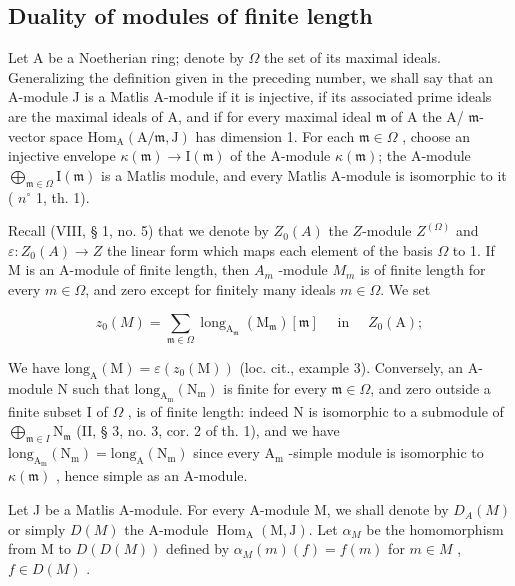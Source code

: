 \subsection{Duality of modules of finite length}

Let A be a Noetherian ring; denote by \(\Omega\) the set of its maximal ideals. Generalizing the definition given in the preceding number, we shall say that an A-module J is a Matlis A-module if it is injective, if its associated prime ideals are the maximal ideals of A, and if for every maximal ideal \(\mathfrak{m}\) of A the A/ \(\mathfrak{m}\)-vector space \(\mathrm{Hom}_{\mathrm{A}}(\mathrm{A}/\mathfrak{m},\mathrm{J})\) has dimension 1. For each \(\mathfrak{m} \in \Omega\) , choose an injective envelope \(\kappa(\mathfrak{m}) \to \mathrm{I}(\mathfrak{m})\) of the A-module \(\kappa(\mathfrak{m})\); the A-module \(\bigoplus_{\mathfrak{m} \in \Omega} \mathrm{I}(\mathfrak{m})\) is a Matlis module, and every Matlis A-module is isomorphic to it ( \(n^{\circ}\) 1, th. 1).

Recall (VIII, § 1, no. 5) that we denote by \(Z_0(A)\) the \(Z\)-module \(Z^{(\Omega)}\) and \(\varepsilon : Z_0(A) \to Z\) the linear form which maps each element of the basis \(\Omega\) to 1. If M is an A-module of finite length, then \(A_m\) -module \(M_m\) is of finite length for every \(m \in \Omega\), and zero except for finitely many ideals \(m \in \Omega\). We set

\[
z _ {0} (M) = \sum_ {\mathfrak {m} \in \Omega} \operatorname{long} _ {\mathrm{A} _ {\mathfrak {m}}} (\mathrm{M} _ {\mathfrak {m}}) [ \mathfrak {m} ] \quad \text { in } \quad Z _ {0} (\mathrm{A});
\]

We have \(\mathrm{long}_{\mathrm{A}}(\mathrm{M}) = \varepsilon(z_0(\mathrm{M}))\) (loc. cit., example 3). Conversely, an A-module N such that \(\mathrm{long}_{\mathrm{A_m}}(\mathrm{N_m})\) is finite for every \(\mathfrak{m} \in \Omega\), and zero outside a finite subset I of \(\Omega\) , is of finite length: indeed N is isomorphic to a submodule of \(\bigoplus_{\mathfrak{m} \in I} \mathrm{N}_{\mathfrak{m}}\) (II, § 3, no. 3, cor. 2 of th. 1), and we have \(\mathrm{long}_{\mathrm{A_m}}(\mathrm{N_m}) = \mathrm{long}_\mathrm{A}(\mathrm{N_m})\) since every \(\mathrm{A_m}\) -simple module is isomorphic to \(\kappa(\mathfrak{m})\) , hence simple as an A-module.

Let J be a Matlis A-module. For every A-module M, we shall denote by \(D_{A}(M)\) or simply \(D(M)\) the A-module \(\operatorname{Hom}_{\mathrm{A}}(\mathrm{M},\mathrm{J})\). Let \(\alpha_{M}\) be the homomorphism from M to \(D(D(M))\) defined by \(\alpha_{M}(m)(f)=f(m)\) for \(m\in M\) , \(f\in D(M)\) .


